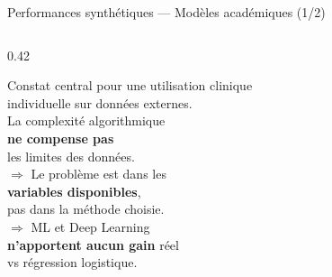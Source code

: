 \documentclass[aspectratio=169]{beamer}
\begin{document}
\begin{frame}{Performances synthétiques --- Modèles académiques (1/2)}
\begin{columns}[T]
\begin{column}{0.42\textwidth}
\begin{alertblock}{Constat central}
        pour une utilisation clinique\\
        individuelle sur données externes.\\[6pt]
        La complexité algorithmique\\
        \textbf{ne compense pas}\\
        les limites des données.\\[6pt]
        $\Rightarrow$ Le problème est dans les\\
        \textbf{variables disponibles},\\
        pas dans la méthode choisie.\\[6pt]
        $\Rightarrow$ ML et Deep Learning\\
        \textbf{n'apportent aucun gain} réel\\
        vs régression logistique.
      \end{alertblock}
    \end{column}
  \end{columns}
\end{frame}
\end{document}
